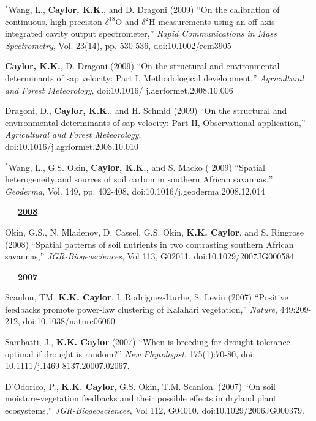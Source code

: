 \documentclass[10pt]{report}
\begin{document}
\begin{etaremune}
\item $^{*}$Wang, L., \textbf{Caylor, K.K.}, and D. Dragoni (2009) ``On the calibration of continuous, high-precision $\delta^{18}$O and $\delta^{2}$H measurements using an off-axis integrated cavity output spectrometer,''  \emph{Rapid Communications in Mass Spectrometry}, Vol. 23(14), pp. 530-536, doi:10.1002/rcm3905

\item \textbf{Caylor, K.K.}, D. Dragoni (2009) ``On the structural and environmental determinants of sap velocity: Part I, Methodological development,''  \emph{Agricultural and Forest Meteorology}, doi:10.1016/ j.agrformet.2008.10.006

\item Dragoni, D., \textbf{Caylor, K.K.}, and H. Schmid (2009) ``On the structural and environmental determinants of sap velocity: Part II, Observational application,'' {\em Agricultural and Forest Meteorology}, \\ doi:10.1016/j.agrformet.2008.10.010

\item $^{*}$Wang, L., G.S. Okin, \textbf{ Caylor, K.K.}, and S. Macko (	2009) ``Spatial heterogeneity and sources of soil carbon in southern African savannas,'' {\em Geoderma}, Vol. 149, pp. 402-408, doi:10.1016/j.geoderma.2008.12.014

\mbox{\ \ \ \underline{\textbf{2008}}}

\item Okin, G.S., N. Mladenov, D. Cassel, G.S. Okin, {\bf K.K. Caylor}, and S. Ringrose (2008) ``Spatial patterns of soil nutrients in two contrasting southern African savannas,''  \emph{JGR-Biogeosciences}, Vol 113, G02011, doi:10.1029/2007JG000584

\mbox{\ \ \ \underline{\textbf{2007}}}

\item Scanlon, TM, \textbf{K.K. Caylor}, I. Rodriguez-Iturbe, S. Levin (2007) ``Positive feedbacks promote power-law clustering of Kalahari vegetation,''  \emph{Nature}, 449:209-212, doi:10.1038/nature06060

\item Sambatti, J., \textbf{K.K. Caylor} (2007) ``When is breeding for drought tolerance optimal if drought is random?'' \emph{New Phytologist}, 175(1):70-80, doi: 10.1111/j.1469-8137.20007.02067.

\item D'Odorico, P., \textbf{K.K. Caylor}, G.S. Okin, T.M. Scanlon. (2007) ``On soil moisture-vegetation feedbacks and their possible effects in dryland plant ecosystems,'' \emph{JGR-Biogeosciences}, Vol 112, G04010, doi:10.1029/2006JG000379.


\end{etaremune}
\end{document}
